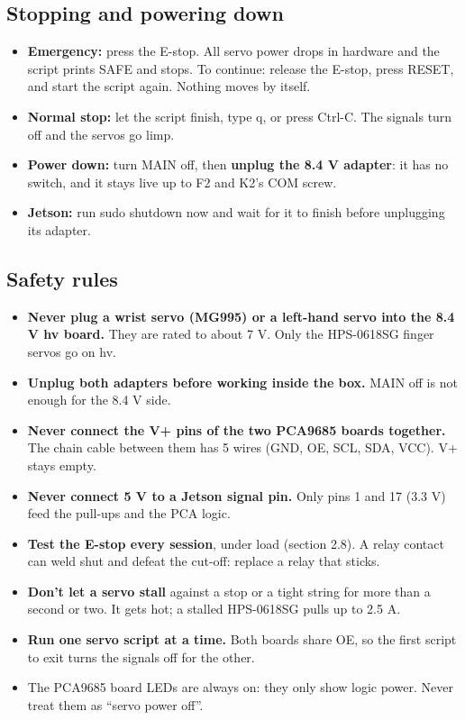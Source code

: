 \documentclass[11pt,letterpaper]{article}
\newcommand{\code}[1]{\textcolor{codeblue}{\ttfamily\smaller\relax #1}}
\begin{document}
\subsection{Stopping and powering down}
\begin{itemize}
  \item \textbf{Emergency:} press the E-stop. All servo power drops in hardware and the script prints SAFE and stops. To continue: release the E-stop, press RESET, and start the script again. Nothing moves by itself.
  \item \textbf{Normal stop:} let the script finish, type \code{q}, or press Ctrl-C. The signals turn off and the servos go limp.
  \item \textbf{Power down:} turn MAIN off, then \textbf{unplug the 8.4 V adapter}: it has no switch, and it stays live up to F2 and K2's COM screw.
  \item \textbf{Jetson:} run \code{sudo shutdown now} and wait for it to finish before unplugging its adapter.
\end{itemize}


\subsection{Safety rules}
\begin{itemize}
  \item \textbf{Never plug a wrist servo (MG995) or a left-hand servo into the 8.4 V \code{hv} board.} They are rated to about 7 V. Only the HPS-0618SG finger servos go on \code{hv}.
  \item \textbf{Unplug both adapters before working inside the box.} MAIN off is not enough for the 8.4 V side.
  \item \textbf{Never connect the V+ pins of the two PCA9685 boards together.} The chain cable between them has 5 wires (GND, OE, SCL, SDA, VCC). V+ stays empty.
  \item \textbf{Never connect 5 V to a Jetson signal pin.} Only pins 1 and 17 (3.3 V) feed the pull-ups and the PCA logic.
  \item \textbf{Test the E-stop every session}, under load (section 2.8). A relay contact can weld shut and defeat the cut-off: replace a relay that sticks.
  \item \textbf{Don't let a servo stall} against a stop or a tight string for more than a second or two. It gets hot; a stalled HPS-0618SG pulls up to 2.5 A.
  \item \textbf{Run one servo script at a time.} Both boards share OE, so the first script to exit turns the signals off for the other.
  \item The PCA9685 board LEDs are always on: they only show logic power. Never treat them as ``servo power off''.
\end{itemize}
\end{document}
